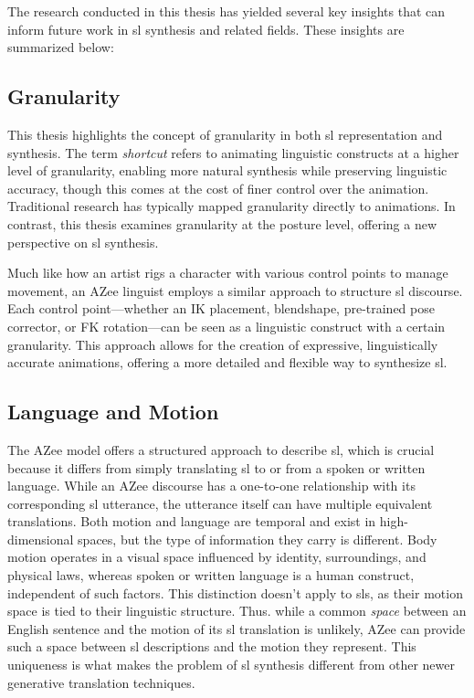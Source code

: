 \documentclass[../../main.tex]{subfiles}
\begin{document}
The research conducted in this thesis has yielded several key insights that can inform future work in \gls{sl} synthesis and related fields. These insights are summarized below:

\subsection{Granularity}
\label{ch:conclusion:key_insights:granularity}

This thesis highlights the concept of granularity in both \gls{sl} representation and synthesis. The term \emph{shortcut} refers to animating linguistic constructs at a higher level of granularity, enabling more natural synthesis while preserving linguistic accuracy, though this comes at the cost of finer control over the animation. Traditional research has typically mapped granularity directly to animations. In contrast, this thesis examines granularity at the posture level, offering a new perspective on \gls{sl} synthesis.

Much like how an artist rigs a character with various control points to manage movement, an AZee linguist employs a similar approach to structure \gls{sl} discourse. Each control point—whether an IK placement, blendshape, pre-trained pose corrector, or FK rotation—can be seen as a linguistic construct with a certain granularity. This approach allows for the creation of expressive, linguistically accurate animations, offering a more detailed and flexible way to synthesize \gls{sl}.

\subsection{Language and Motion}
\label{ch:conclusion:key_insights:language_motion}

The AZee model offers a structured approach to describe \gls{sl}, which is crucial because it differs from simply translating \gls{sl} to or from a spoken or written language. While an AZee discourse has a one-to-one relationship with its corresponding \gls{sl} utterance, the utterance itself can have multiple equivalent translations. Both motion and language are temporal and exist in high-dimensional spaces, but the type of information they carry is different. Body motion operates in a visual space influenced by identity, surroundings, and physical laws, whereas spoken or written language is a human construct, independent of such factors. This distinction doesn't apply to \gls{sl}s, as their motion space is tied to their linguistic structure. Thus. while a common \emph{space} between an English sentence and the motion of its \gls{sl} translation is unlikely, AZee can provide such a space between \gls{sl} descriptions and the motion they represent. This uniqueness is what makes the problem of \gls{sl} synthesis different from other newer generative translation techniques.
\end{document}
